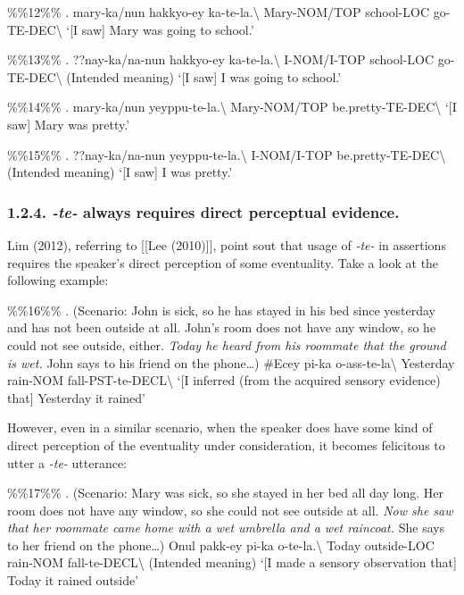 \%\%12\%\% \ex. \gll mary-ka/nun hakkyo-ey ka-te-la.\textbackslash{}
Mary-NOM/TOP school-LOC go-TE-DEC\textbackslash{} `{[}I saw{]} Mary was
going to school.'

\%\%13\%\% \ex. \gll ??nay-ka/na-nun hakkyo-ey ka-te-la.\textbackslash{}
I-NOM/I-TOP school-LOC go-TE-DEC\textbackslash{} (Intended meaning)
`{[}I saw{]} I was going to school.'

\%\%14\%\% \ex. \gll mary-ka/nun yeyppu-te-la.\textbackslash{}
Mary-NOM/TOP be.pretty-TE-DEC\textbackslash{} `{[}I saw{]} Mary was
pretty.'

\%\%15\%\% \ex. \gll ??nay-ka/na-nun yeyppu-te-la.\textbackslash{}
I-NOM/I-TOP be.pretty-TE-DEC\textbackslash{} (Intended meaning) `{[}I
saw{]} I was pretty.'

\hypertarget{te--always-requires-direct-perceptual-evidence.}{%
\subsubsection{\texorpdfstring{1.2.4. \emph{-te-} always requires direct
perceptual
evidence.}{1.2.4. -te- always requires direct perceptual evidence.}}\label{te--always-requires-direct-perceptual-evidence.}}

Lim (2012), referring to {[}{[}Lee (2010){]}{]}, point sout that usage
of \emph{-te-} in assertions requires the speaker's direct perception of
some eventuality. Take a look at the following example:

\%\%16\%\% \ex. (Scenario: John is sick, so he has stayed in his bed
since yesterday and has not been outside at all. John's room does not
have any window, so he could not see outside, either. \emph{Today he
heard from his roommate that the ground is wet.} John says to his friend
on the phone\ldots) \gll \#Ecey pi-ka o-ass-te-la\textbackslash{}
Yesterday rain-NOM fall-PST-te-DECL\textbackslash{} `{[}I inferred (from
the acquired sensory evidence) that{]} Yesterday it rained'

However, even in a similar scenario, when the speaker does have some
kind of direct perception of the eventuality under consideration, it
becomes felicitous to utter a \emph{-te-} utterance:

\%\%17\%\% \ex. (Scenario: Mary was sick, so she stayed in her bed all
day long. Her room does not have any window, so she could not see
outside at all. \emph{Now she saw that her roommate came home with a wet
umbrella and a wet raincoat.} She says to her friend on the phone\ldots)
\gll Onul pakk-ey pi-ka o-te-la.\textbackslash{} Today outside-LOC
rain-NOM fall-te-DECL\textbackslash{} (Intended meaning) `{[}I made a
sensory observation that{]} Today it rained outside'

